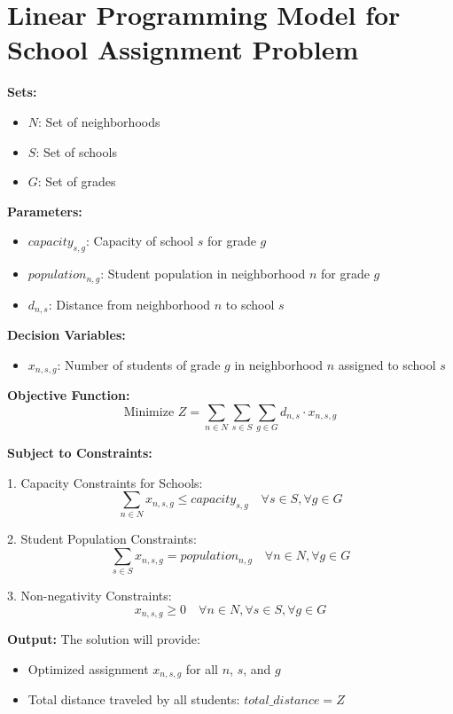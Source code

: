 \documentclass{article}
\begin{document}
\section*{Linear Programming Model for School Assignment Problem}

\textbf{Sets:}
\begin{itemize}
    \item $N$: Set of neighborhoods
    \item $S$: Set of schools
    \item $G$: Set of grades
\end{itemize}

\textbf{Parameters:}
\begin{itemize}
    \item $capacity_{s,g}$: Capacity of school $s$ for grade $g$
    \item $population_{n,g}$: Student population in neighborhood $n$ for grade $g$
    \item $d_{n,s}$: Distance from neighborhood $n$ to school $s$
\end{itemize}

\textbf{Decision Variables:}
\begin{itemize}
    \item $x_{n,s,g}$: Number of students of grade $g$ in neighborhood $n$ assigned to school $s$
\end{itemize}

\textbf{Objective Function:}
\begin{equation}
    \text{Minimize } Z = \sum_{n \in N} \sum_{s \in S} \sum_{g \in G} d_{n,s} \cdot x_{n,s,g}
\end{equation}

\textbf{Subject to Constraints:}

1. Capacity Constraints for Schools:
\begin{equation}
    \sum_{n \in N} x_{n,s,g} \leq capacity_{s,g} \quad \forall s \in S, \forall g \in G
\end{equation}

2. Student Population Constraints:
\begin{equation}
    \sum_{s \in S} x_{n,s,g} = population_{n,g} \quad \forall n \in N, \forall g \in G
\end{equation}

3. Non-negativity Constraints:
\begin{equation}
    x_{n,s,g} \geq 0 \quad \forall n \in N, \forall s \in S, \forall g \in G
\end{equation}

\textbf{Output:}
The solution will provide:
\begin{itemize}
    \item Optimized assignment $x_{n,s,g}$ for all $n$, $s$, and $g$
    \item Total distance traveled by all students: $total\_distance = Z$
\end{itemize}
\end{document}
